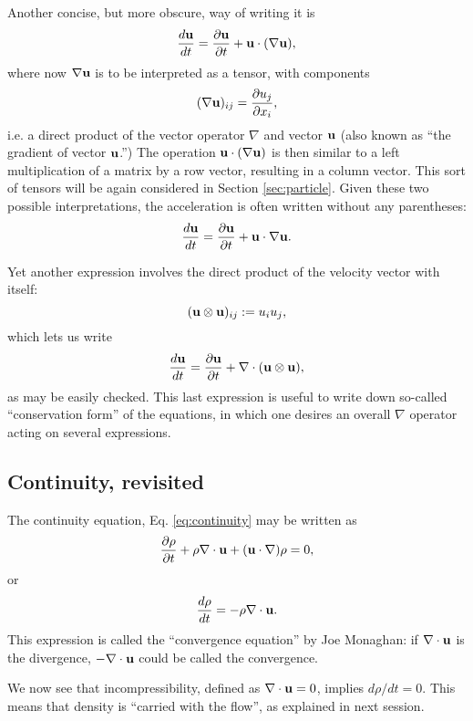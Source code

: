 Another concise, but more obscure, way of writing it is
\[
\frac{d \mathbf{u}  }{dt} =
\frac{\partial \mathbf{u} }{\partial t} +
\mathbf{u} \cdot  ( \nabla  \mathbf{u} ) ,
\]
where now $\nabla  \mathbf{u}$ is to be interpreted as a tensor, with
components
\begin{equation}
  \label{eq:nabla_u_def}
  (\nabla  \mathbf{u})_{ij} = \frac{\partial u_j}{\partial x_i} ,
\end{equation}
i.e. a direct product of the vector operator $\nabla$ and vector
$\mathbf{u}$ (also known as ``the gradient of vector $\mathbf{u}$.'') The
operation $\mathbf{u} \cdot ( \nabla \mathbf{u} )$ is then similar to a left
multiplication of a matrix by a row vector, resulting in a column
vector. This sort of tensors will be again considered in Section
\ref{sec:particle}.  Given these two possible interpretations, the
acceleration is often written without any parentheses:
\[
\frac{d \mathbf{u}  }{dt} =
\frac{\partial \mathbf{u} }{\partial t} +
\mathbf{u} \cdot  \nabla  \mathbf{u} .
\]


Yet another expression involves the direct product of the velocity
vector with itself:
\[
( \mathbf{u} \otimes \mathbf{u} )_{ij} := u_i u_j ,
\]
which lets us write
\begin{equation}
  \label{eq:Euler_uu}
    \frac{d \mathbf{u}  }{dt} =
    \frac{\partial \mathbf{u} }{\partial t} +
    \nabla \cdot ( \mathbf{u} \otimes \mathbf{u} ),  
\end{equation}
as may be easily checked. This last expression is useful to write down
so-called ``conservation form'' of the equations, in which one desires
an overall $\nabla$ operator acting on several expressions.


\subsection{Continuity, revisited}
\label{sec:continuity2}

The continuity equation, Eq. \ref{eq:continuity} may be written as
\[
\frac{\partial \rho }{\partial t} +
\rho \nabla \cdot \mathbf{u} +
(\mathbf{u} \cdot \nabla) \rho = 0 ,
\]
or
%
\begin{equation}
  \label{eq:convergence}
  \frac{d \rho }{d t} = 
  - \rho \nabla  \cdot \mathbf{u} .
\end{equation}
This expression is called the ``convergence equation'' by Joe
Monaghan: if $\nabla \cdot \mathbf{u} $ is the divergence,
$ - \nabla \cdot \mathbf{u} $ could be called the convergence.

We now see that incompressibility, defined as $\nabla \cdot \mathbf{u} = 0
$, implies $d\rho/dt = 0$. This means that density is ``carried
with the flow'', as explained in next session.

